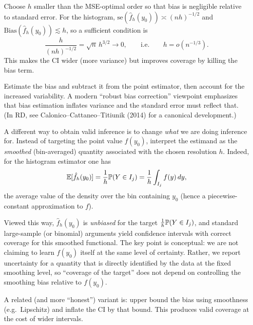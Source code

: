 \begin{remark}
	Choose $h$ smaller than the MSE-optimal order so that bias is negligible relative to standard error.
	For the histogram, $\mathrm{se}(\hat f_h(y_0)) \asymp (nh)^{-1/2}$ and $\mathrm{Bias}(\hat f_h(y_0))\lesssim h$,
	so a sufficient condition is
	\[
		\frac{h}{(nh)^{-1/2}}=\sqrt{n}\,h^{3/2}\to 0,
		\qquad\text{i.e.}\qquad
		h=o(n^{-1/3}).
	\]
	This makes the CI wider (more variance) but improves coverage by killing the bias term.
\end{remark}

\begin{remark}
	Estimate the bias and subtract it from the point estimator, then account for the increased variability.
	A modern ``robust bias correction'' viewpoint emphasizes that bias estimation inflates variance and the standard error
	must reflect that. (In RD, see Calonico--Cattaneo--Titiunik (2014) for a canonical development.)
\end{remark}

\begin{remark}
	A different way to obtain valid inference is to change \emph{what} we are doing inference for.
	Instead of targeting the point value $f(y_0)$, interpret the estimand as the \emph{smoothed} (bin-averaged) quantity
	associated with the chosen resolution $h$.
	Indeed, for the histogram estimator one has
	\[
		\E[\hat f_h(y_0)]
		=
		\frac{1}{h}\P(Y\in I_j)
		=
		\frac{1}{h}\int_{I_j} f(y)\,dy,
	\]
	the average value of the density over the bin containing $y_0$ (hence a piecewise-constant approximation to $f$).

	Viewed this way, $\hat f_h(y_0)$ is \emph{unbiased} for the target $\frac{1}{h}\P(Y\in I_j)$, and standard large-sample
	(or binomial) arguments yield confidence intervals with correct coverage for this smoothed functional.
	The key point is conceptual: we are not claiming to learn $f(y_0)$ itself at the same level of certainty.
	Rather, we report uncertainty for a quantity that is directly identified by the data at the fixed smoothing level,
	so ``coverage of the target'' does not depend on controlling the smoothing bias relative to $f(y_0)$.
\end{remark}

\begin{aside}	A related (and more ``honest'') variant is: upper bound the bias using smoothness (e.g.\ Lipschitz) and inflate the CI
	by that bound. This produces valid coverage at the cost of wider intervals.
\end{aside}
